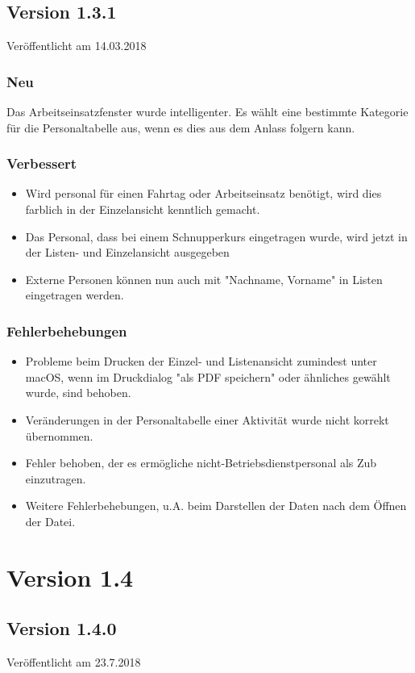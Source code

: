 \subsection{Version 1.3.1}
Veröffentlicht am 14.03.2018
\subsubsection{Neu}
Das Arbeitseinsatzfenster wurde intelligenter. Es wählt eine bestimmte Kategorie für die Personaltabelle aus, wenn es dies aus dem Anlass folgern kann.

\subsubsection{Verbessert}
\begin{itemize}
  \item
  Wird personal für einen Fahrtag oder Arbeitseinsatz benötigt, wird dies farblich in der Einzelansicht kenntlich gemacht.
  \item
  Das Personal, dass bei einem Schnupperkurs eingetragen wurde, wird jetzt in der Listen- und Einzelansicht ausgegeben
  \item
  Externe Personen können nun auch mit "Nachname, Vorname" in Listen eingetragen werden.
\end{itemize}

\subsubsection{Fehlerbehebungen}
\begin{itemize}
  \item
  Probleme beim Drucken der Einzel- und Listenansicht zumindest unter macOS, wenn im Druckdialog "als PDF speichern" oder ähnliches gewählt wurde, sind behoben.
  \item
  Veränderungen in der Personaltabelle einer Aktivität wurde nicht korrekt übernommen.
  \item
  Fehler behoben, der es ermögliche nicht-Betriebsdienstpersonal als Zub einzutragen.
  \item
  Weitere Fehlerbehebungen, u.A. beim Darstellen der Daten nach dem Öffnen der Datei.
\end{itemize}



\section{Version 1.4}
\subsection{Version 1.4.0}
Veröffentlicht am 23.7.2018
